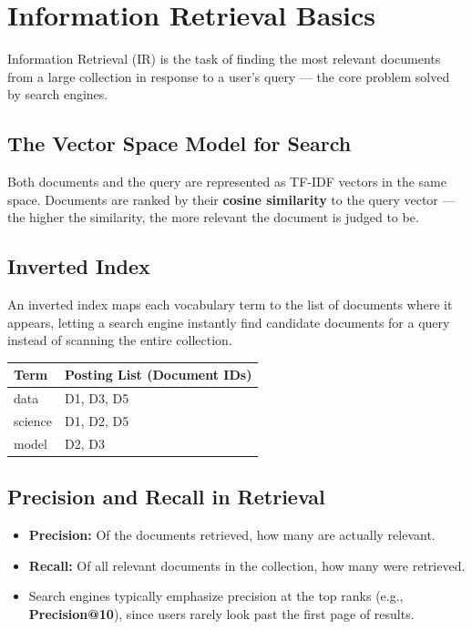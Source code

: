 \documentclass[11pt,a4paper]{article}
\begin{document}
\section{Information Retrieval Basics}

\begin{definitionbox}
Information Retrieval (IR) is the task of finding the most relevant documents from a large collection in response to a user's query --- the core problem solved by search engines.
\end{definitionbox}

\subsection{The Vector Space Model for Search}
\begin{conceptbox}
Both documents and the query are represented as TF-IDF vectors in the same space. Documents are ranked by their \textbf{cosine similarity} to the query vector --- the higher the similarity, the more relevant the document is judged to be.
\end{conceptbox}

\subsection{Inverted Index}
\begin{definitionbox}
An inverted index maps each vocabulary term to the list of documents where it appears, letting a search engine instantly find candidate documents for a query instead of scanning the entire collection.
\end{definitionbox}

\begin{center}
\begin{tabular}{@{}p{2.6cm}p{10.9cm}@{}}
\toprule
\rowcolor{primary!15}
\textbf{Term} & \textbf{Posting List (Document IDs)} \\
\midrule
data & D1, D3, D5 \\
science & D1, D2, D5 \\
model & D2, D3 \\
\bottomrule
\end{tabular}
\end{center}

\subsection{Precision and Recall in Retrieval}
\begin{itemize}[leftmargin=*]
  \item \textbf{Precision:} Of the documents retrieved, how many are actually relevant.
  \item \textbf{Recall:} Of all relevant documents in the collection, how many were retrieved.
  \item Search engines typically emphasize precision at the top ranks (e.g., \textbf{Precision@10}), since users rarely look past the first page of results.
\end{itemize}
\end{document}
